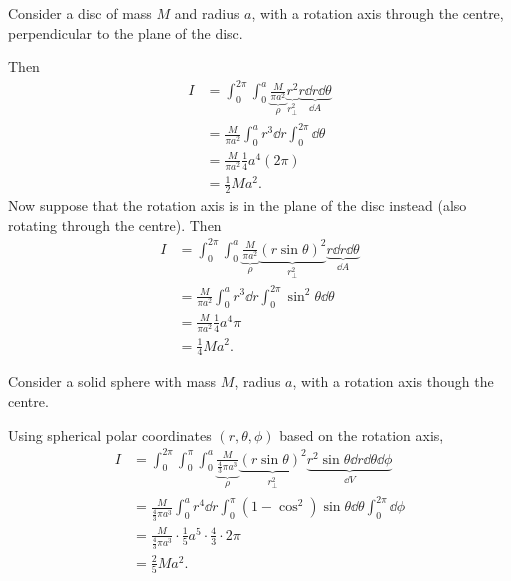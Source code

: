 \begin{example}
  Consider a disc of mass $M$ and radius $a$, with a rotation axis through the centre, perpendicular to the plane of the disc.
  \begin{center}
  \end{center}
  Then
  \begin{align*}
    I &= \int_{0}^{2\pi}\int_0^a \underbrace{\frac{M}{\pi a^2}}_{\rho} \underbrace{r^2}_{r_\perp^2} \underbrace{r\dd r\dd \theta}_{\dd A}\\
    &= \frac{M}{\pi a^2}\int_0^a r^3\dd r \int_0^{2\pi}\dd \theta\\
    &= \frac{M}{\pi a^2}\frac{1}{4}a^4 (2\pi)\\
    &= \frac{1}{2}Ma^2.
  \end{align*}
  Now suppose that the rotation axis is in the plane of the disc instead (also rotating through the centre). Then
  \begin{align*}
    I &= \int_{0}^{2\pi}\int_0^a \underbrace{\frac{M}{\pi a^2}}_{\rho} \underbrace{(r\sin \theta)^2}_{r_\perp^2} \underbrace{r\dd r\dd \theta}_{\dd A}\\
    &= \frac{M}{\pi a^2}\int_0^a r^3\dd r \int_0^{2\pi}\sin^2 \theta\dd \theta\\
    &= \frac{M}{\pi a^2}\frac{1}{4}a^4 \pi\\
    &= \frac{1}{4}Ma^2.
  \end{align*}
\end{example}

\begin{example}
  Consider a solid sphere with mass $M$, radius $a$, with a rotation axis though the centre.
  \begin{center}
  \end{center}
  Using spherical polar coordinates $(r, \theta, \phi)$ based on the rotation axis,
  \begin{align*}
    I &= \int_{0}^{2\pi}\int_0^\pi\int_0^a \underbrace{\frac{M}{\frac{4}{3}\pi a^3}}_{\rho}\underbrace{(r\sin \theta)^2}_{r_\perp^2} \underbrace{r^2\sin \theta\dd r\dd \theta\dd \phi}_{\dd V}\\
    &= \frac{M}{\frac{4}{3}\pi a^3}\int_0^a r^4 \dd r\int_0^\pi (1 - \cos^2)\sin \theta\dd \theta \int_0^{2\pi}\dd \phi\\
    &= \frac{M}{\frac{4}{3}\pi a^3}\cdot \frac{1}{5}a^5 \cdot \frac{4}{3}\cdot 2\pi\\
    &= \frac{2}{5}Ma^2.
  \end{align*}
\end{example}

